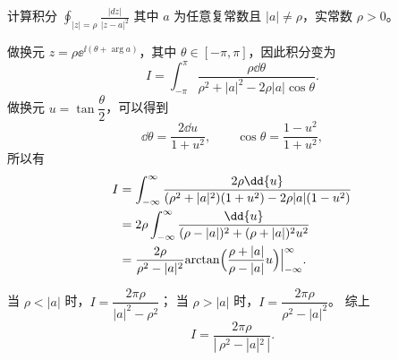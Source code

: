\begin{question}
计算积分 \(\displaystyle \oint_{|z|=\rho} \frac{|dz|}{|z-a|^2}\) 其中 \(a\) 为任意复常数且 \(|a|\neq\rho\)，实常数 \(\rho>0\)。
\begin{solution}
做换元 \(z=\rho\ee^{\ii(\theta+\arg a)}\)，其中 \(\theta\in[-\pi,\pi]\)，因此积分变为
\[
I=\int_{-\pi}^{\pi}\frac{\rho\dd{\theta}}{\rho^2+|a|^2-2\rho|a|\cos\theta}.

\]
做换元 \(u=\tan\dfrac{\theta}{2}\)，可以得到
\[
\dd{\theta}=\frac{2\dd{u}}{1+u^2},\qquad \cos\theta=\frac{1-u^2}{1+u^2},
\]
所以有
\[
\begin{aligned}
I&=\int_{-\infty}^{\infty}\frac{2\rho\dd{u}}{(\rho^2+|a|^2)(1+u^2)-2\rho|a|(1-u^2)}\\
&=2\rho\int_{-\infty}^{\infty}\frac{\dd{u}}{(\rho-|a|)^2+(\rho+|a|)^2u^2}\\
&=\frac{2\rho}{\rho^2-|a|^2}\Bigl.\arctan\Bigl(\frac{\rho+|a|}{\rho-|a|}u\Bigr)\Bigr|_{-\infty}^{\infty}.
\end{aligned}
\]

当 \(\rho<|a|\) 时，\(I=\dfrac{2\pi\rho}{|a|^2-\rho^2}\)；
当 \(\rho>|a|\) 时，\(I=\dfrac{2\pi\rho}{\rho^2-|a|^2}\)。
综上
\[
I=\frac{2\pi\rho}{|\,\rho^2-|a|^2\,|}.
\]
\end{solution}
\end{question}

